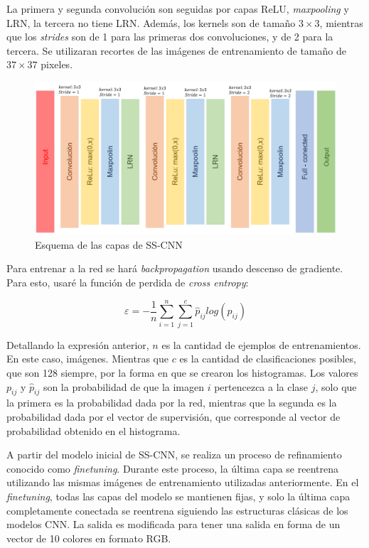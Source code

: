 \documentclass[14pt,a4paper]{report}
\begin{document}
La primera y segunda convolución son seguidas por capas ReLU, \textit{maxpooling} y LRN, la tercera no tiene LRN. Además, los kernels son de tamaño $3\times3$, mientras que los \textit{strides} son de 1 para las primeras dos convoluciones, y de 2 para la tercera. Se utilizaran recortes de las imágenes de entrenamiento de tamaño de $37\times 37$ pixeles.

\begin{figure}[h]
  \centering
\includegraphics[scale=0.5]{../esquema-capas.png} 
  \caption{Esquema de las capas de SS-CNN}
  \label{fig:neural-network}
\end{figure}

Para entrenar a la red se hará \textit{backpropagation} usando descenso de gradiente. Para esto, usaré la función de perdida de \textit{cross entropy}:

$$
\varepsilon = -\frac{1}{n}\sum^{n}_{i=1}\sum^{c}_{j=1}\hat{p}_{ij}log(p_{ij})
$$

Detallando la expresión anterior, $n$ es la cantidad de ejemplos de entrenamientos. En este caso, imágenes. Mientras que $c$ es la cantidad de clasificaciones posibles, que son 128 siempre, por la forma en que se crearon los histogramas. Los valores $p_{ij}$ y $\hat{p}_{ij}$ son la probabilidad de que la imagen $i$ pertencezca a la clase $j$, solo que la primera es la probabilidad dada por la red, mientras que la segunda es la probabilidad dada por el vector de supervisión, que corresponde al vector de probabilidad obtenido en el histograma.

A partir del modelo inicial de SS-CNN, se realiza un proceso de refinamiento conocido como \textit{finetuning}. Durante este proceso, la última capa se reentrena utilizando las mismas imágenes de entrenamiento utilizadas anteriormente. En el \textit{finetuning}, todas las capas del modelo se mantienen fijas, y solo la última capa completamente conectada se reentrena siguiendo las estructuras clásicas de los modelos CNN. La salida es modificada para tener una salida en forma de un vector de 10 colores en formato RGB.
\end{document}
